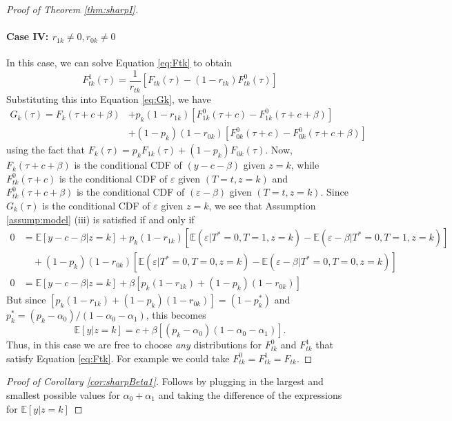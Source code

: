 \begin{proof}[Proof of Theorem \ref{thm:sharpI}]
\paragraph{Case IV: $r_{1k}\neq 0, r_{0k} \neq 0$}
In this case, we can solve Equation \ref{eq:Ftk} to obtain
\[
  F^1_{tk}(\tau) = \frac{1}{r_{tk}}\left[F_{tk}(\tau) - (1 - r_{tk})F^0_{tk}(\tau)\right]
\]
Substituting this into Equation \ref{eq:Gk}, we have
\begin{align*}
  G_k(\tau) = F_k(\tau + c + \beta) &+ p_k(1 - r_{1k})\left[F^0_{1k}(\tau + c) - F_{1k}^0(\tau + c + \beta)\right]\\
  &+ (1 - p_k)(1 - r_{0k}) \left[ F^0_{0k}(\tau + c) - F^0_{0k}(\tau + c + \beta) \right]
\end{align*}
using the fact that $F_k(\tau) = p_k F_{1k}(\tau) + (1 - p_k) F_{0k}(\tau)$.
Now, $F_k(\tau + c + \beta)$ is the conditional CDF of $(y - c - \beta)$ given $z=k$, while $F_{tk}^0(\tau + c)$ is the conditional CDF of $\varepsilon$ given $(T = t,z =k)$ and $F^0_{tk}(\tau + c + \beta)$ is the conditional CDF of $(\varepsilon - \beta)$ given $(T = t, z=k)$.
Since $G_k(\tau)$ is the conditional CDF of $\varepsilon$ given $z=k$, we see that Assumption \ref{assump:model} (iii) is satisfied if and only if
\begin{align*}
  0 &= \mathbb{E}[y - c - \beta|z=k] + p_k(1 - r_{1k})\left[ \mathbb{E}(\varepsilon|T^*=0,T=1,z=k) - \mathbb{E}(\varepsilon - \beta|T^*=0,T=1,z=k) \right] \\
   &\quad + (1 - p_k)(1 - r_{0k})\left[ \mathbb{E}(\varepsilon|T^*=0,T=0,z=k) - \mathbb{E}(\varepsilon - \beta|T^*=0,T=0,z=k) \right]\\
   0 &= \mathbb{E}[y - c - \beta|z=k] + \beta\left[p_k(1 - r_{1k}) + (1 - p_k)(1 - r_{0k})\right]
\end{align*}
But since $\left[p_k(1 - r_{1k}) + (1 - p_k)(1 - r_{0k})\right] = (1 - p_k^*)$ and $p_k^* = (p_k - \alpha_0) /(1 - \alpha_0 - \alpha_1)$, this becomes 
\[
\mathbb{E}[y|z=k] = c + \beta\left[ (p_k - \alpha_0)(1 - \alpha_0 - \alpha_1) \right].
\]
Thus, in this case we are free to choose \emph{any} distributions for $F^{0}_{tk}$ and $F^1_{tk}$ that satisfy Equation \ref{eq:Ftk}.
For example we could take $F^0_{tk} = F^1_{tk} = F_{tk}$.
\end{proof}

\begin{proof}[Proof of Corollary \ref{cor:sharpBeta1}]
Follows by plugging in the largest and smallest possible values for $\alpha_0 + \alpha_1$ and taking the difference of the expressions for $\mathbb{E}[y|z=k]$
\end{proof}


